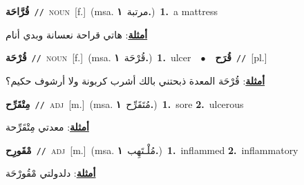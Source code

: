 \documentclass[10pt,a4paper,twoside]{article} %
\begin{document}
\begin{multicols}{2}
{\setlength\topsep{0pt}\textbf{\foreignlanguage{arabic}{قُرَّاحَة}}\ {\color{gray}\texttt{//}\color{black}}\ \textsc{noun}\ [f.]\ \color{gray}(msa. \foreignlanguage{arabic}{مرتبة}~\foreignlanguage{arabic}{\textbf{١.}})\color{black}\ \textbf{1.}~a mattress\  \begin{flushright}\color{gray}\foreignlanguage{arabic}{\textbf{\underline{\foreignlanguage{arabic}{أمثلة}}}: هاتي قراحة نعسانة وبدي أنام}\end{flushright}\color{black}} \vspace{2mm}

{\setlength\topsep{0pt}\textbf{\foreignlanguage{arabic}{قُرْحَة}}\ {\color{gray}\texttt{//}\color{black}}\ \textsc{noun}\ [f.]\ \color{gray}(msa. \foreignlanguage{arabic}{قُرْحَة}~\foreignlanguage{arabic}{\textbf{١.}})\color{black}\ \textbf{1.}~ulcer\ \ $\bullet$\ \ \setlength\topsep{0pt}\textbf{\foreignlanguage{arabic}{قُرَح}}\ {\color{gray}\texttt{//}\color{black}}\ [pl.]\  \begin{flushright}\color{gray}\foreignlanguage{arabic}{\textbf{\underline{\foreignlanguage{arabic}{أمثلة}}}: قُرْحَة المعدة ذبحتني بالك أشرب كربونة ولا أرشوف حكيم؟}\end{flushright}\color{black}} \vspace{2mm}

{\setlength\topsep{0pt}\textbf{\foreignlanguage{arabic}{مِتْقَرِّح}}\ {\color{gray}\texttt{//}\color{black}}\ \textsc{adj}\ [m.]\ \color{gray}(msa. \foreignlanguage{arabic}{مُتَقَرِّح}~\foreignlanguage{arabic}{\textbf{١.}})\color{black}\ \textbf{1.}~sore  \textbf{2.}~ulcerous\  \begin{flushright}\color{gray}\foreignlanguage{arabic}{\textbf{\underline{\foreignlanguage{arabic}{أمثلة}}}: معدتي مِتْقَرِّحة}\end{flushright}\color{black}} \vspace{2mm}

{\setlength\topsep{0pt}\textbf{\foreignlanguage{arabic}{مْقَورِح}}\ {\color{gray}\texttt{//}\color{black}}\ \textsc{adj}\ [m.]\ \color{gray}(msa. \foreignlanguage{arabic}{مُلْـتَهِب}~\foreignlanguage{arabic}{\textbf{١.}})\color{black}\ \textbf{1.}~inflammed  \textbf{2.}~inflammatory\  \begin{flushright}\color{gray}\foreignlanguage{arabic}{\textbf{\underline{\foreignlanguage{arabic}{أمثلة}}}: دلدولتي مْقُورْحَة}\end{flushright}\color{black}} \vspace{2mm}


\end{multicols}
\end{document}
